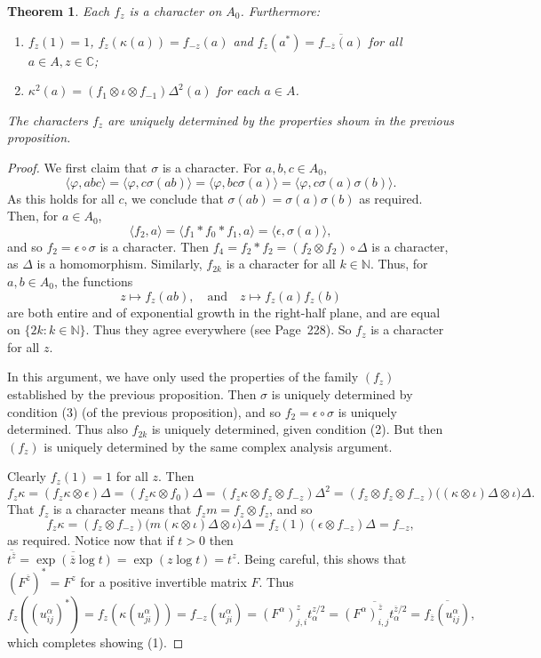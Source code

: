 \documentclass[twoside,a4paper,12pt]{article}
\theoremstyle{plain}
\newtheorem{theorem}[proposition]{Theorem}
\theoremstyle{definition}
\newcommand{\ip}[2]{\langle #1,#2 \rangle}
\begin{document}
\begin{theorem}
Each $f_z$ is a character on $A_0$.  Furthermore:
\begin{enumerate}
\item $f_z(1)=1$, $f_z(\kappa(a)) = f_{-z}(a)$ and $f_z(a^*)
  = \overline{ f_{-\overline z}(a) }$ for all $a\in A,z\in\mathbb C$;
\item $\kappa^2(a) = (f_1\otimes\iota\otimes f_{-1})\Delta^2(a)$
  for each $a\in A$.
\end{enumerate}
The characters $f_z$ are uniquely determined by the properties shown in
the previous proposition.
\end{theorem}
\begin{proof}
We first claim that $\sigma$ is a character.  For $a,b,c\in A_0$,
\[ \ip{\varphi}{abc} = \ip{\varphi}{c\sigma(ab)}
= \ip{\varphi}{bc\sigma(a)} = \ip{\varphi}{c\sigma(a) \sigma(b)}. \]
As this holds for all $c$, we conclude that $\sigma(ab) = \sigma(a)\sigma(b)$
as required.  Then, for $a\in A_0$,
\[ \ip{f_2}{a} = \ip{f_1 * f_0 * f_1}{a} = \ip{\epsilon}{\sigma(a)}, \]
and so $f_2 = \epsilon\circ\sigma$ is a character.  Then
$f_4 = f_2*f_2 = (f_2\otimes f_2)\circ\Delta$ is a character, as $\Delta$ is
a homomorphism.  Similarly, $f_{2k}$ is a character for all $k\in\mathbb N$.
Thus, for $a,b\in A_0$, the functions
\[ z\mapsto f_z(ab), \quad\text{and}\quad z\mapsto f_z(a)f_z(b) \]
are both entire and of exponential growth in the right-half plane, and are
equal on $\{ 2k : k\in\mathbb N\}$.  Thus they agree everywhere
(see \cite{woro1}{Page~228}).  So $f_z$ is a character for all $z$.

In this argument, we have only used the properties of the family $(f_z)$
established by the previous proposition.  Then $\sigma$ is uniquely
determined by condition (3) (of the previous proposition), and so
$f_2 = \epsilon\circ\sigma$ is uniquely determined.  Thus also $f_{2k}$
is uniquely determined, given condition (2).  But then $(f_z)$ is
uniquely determined by the same complex analysis argument.

Clearly $f_z(1)=1$ for all $z$.  Then
\[ f_z\kappa = (f_z\kappa\otimes\epsilon)\Delta
= (f_z\kappa\otimes f_0)\Delta
= (f_z\kappa\otimes f_z \otimes f_{-z})\Delta^2
= (f_z\otimes f_z\otimes f_{-z})\big( (\kappa\otimes\iota)\Delta
\otimes\iota\big)\Delta. \]
That $f_z$ is a character means that $f_zm = f_z\otimes f_z$, and so
\[ f_z\kappa = 
(f_z\otimes f_{-z})\big( m(\kappa\otimes\iota)\Delta \otimes \iota\big) \Delta
= f_z(1) (\epsilon\otimes f_{-z})\Delta
= f_{-z}, \]
as required.  Notice now that if $t>0$ then $\overline{t^{\overline z}}
= \overline{\exp(\overline{z}\log t)} = \exp(z\log t) = t^z$.  Being careful,
this shows that $(F^{\overline z})^* = F^z$ for a positive invertible
matrix $F$.  Thus
\[ f_z( (u^\alpha_{ij})^* ) = f_z( \kappa(u^\alpha_{ji}))
= f_{-z}(u^\alpha_{ji})
= (F^\alpha)^z_{j,i} t_\alpha^{z/2}
= \overline{ (F^\alpha)^{\overline z}_{i,j} t_\alpha^{\overline z/2} }
= \overline{ f_{\overline z}( u^\alpha_{ij} ) }, \]
which completes showing (1).


\end{proof}
\end{document}
